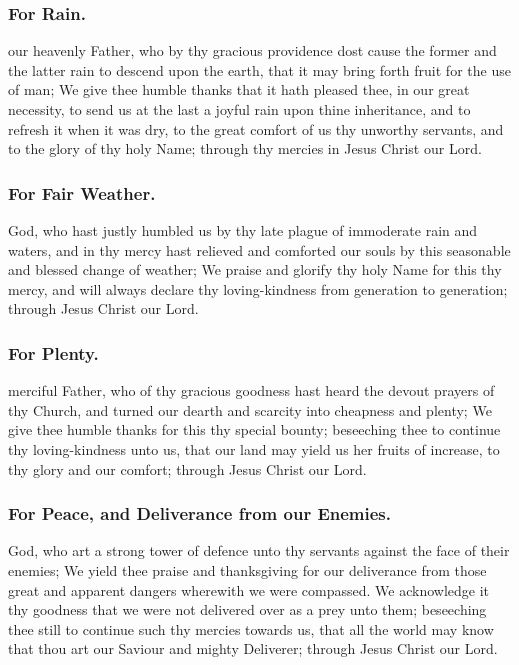 \subsubsection{For Rain.}
 our heavenly Father, who by thy gracious providence dost cause the former and the latter rain to descend upon the earth, that it may bring forth fruit for the use of man; We give thee humble thanks that it hath pleased thee, in our great necessity, to send us at the last a joyful rain upon thine inheritance, and to refresh it when it was dry, to the great comfort of us thy unworthy servants, and to the glory of thy holy Name; through thy mercies in Jesus Christ our Lord.

\subsubsection{For Fair Weather.}
 God, who hast justly humbled us by thy late plague of immoderate rain and waters, and in thy mercy hast relieved and comforted our souls by this seasonable and blessed change of weather; We praise and glorify thy holy Name for this thy mercy, and will always declare thy loving-kindness from generation to generation; through Jesus Christ our Lord.

\subsubsection{For Plenty.}
 merciful Father, who of thy gracious goodness hast heard the devout prayers of thy Church, and turned our dearth and scarcity into cheapness and plenty; We give thee humble thanks for this thy special bounty; beseeching thee to continue thy loving-kindness unto us, that our land may yield us her fruits of increase, to thy glory and our comfort; through Jesus Christ our Lord.

\subsubsection{For Peace, and Deliverance from our Enemies.}
 God, who art a strong tower of defence unto thy servants against the face of their enemies; We yield thee praise and thanksgiving for our deliverance from those great and apparent dangers wherewith we were compassed. We acknowledge it thy goodness that we were not delivered over as a prey unto them; beseeching thee still to continue such thy mercies towards us, that all the world may know that thou art our Saviour and mighty Deliverer; through Jesus Christ our Lord.

